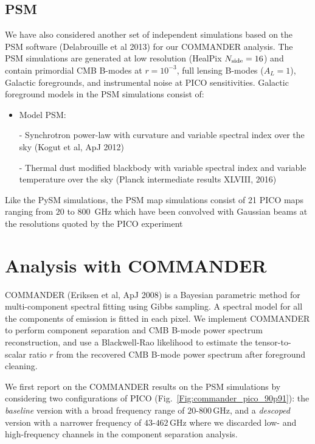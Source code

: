\documentclass[12pt]{article}
\begin{document}
\subsection{PSM}\label{subsec:psm}

We have also considered another set of independent simulations based on the PSM software (Delabrouille et al 2013) for our COMMANDER analysis. The PSM simulations are generated at low resolution (HealPix $N_{\rm side}=16$) and contain primordial CMB B-modes at $r=10^{-3}$, full lensing B-modes ($A_L=1$), Galactic foregrounds, and instrumental noise at PICO sensitivities. Galactic foreground models in the PSM simulations consist of:

\begin{itemize}
\item Model PSM: 

- Synchrotron power-law with curvature and variable spectral index over the sky (Kogut et al, ApJ 2012)

- Thermal dust modified blackbody with variable spectral index and variable temperature over the sky (Planck intermediate results XLVIII, 2016)

\end{itemize}

Like the PySM simulations, the PSM map simulations consist of 21 PICO maps ranging from $20$ to $800$\, GHz which have been convolved with Gaussian beams at the resolutions quoted by the PICO experiment 


\section{Analysis with COMMANDER}

COMMANDER (Eriksen et al, ApJ 2008) is a Bayesian parametric method for multi-component spectral fitting using Gibbs sampling. A spectral model for all the components of emission is fitted in each pixel. We implement COMMANDER to perform component separation and CMB B-mode power spectrum reconstruction, and use a Blackwell-Rao likelihood to estimate the tensor-to-scalar ratio $r$ from the recovered CMB B-mode power spectrum after foreground cleaning.

We first report on the COMMANDER results on the PSM simulations by considering two configurations of PICO (Fig.~\ref{Fig:commander_pico_90p91}): the \emph{baseline} version with a broad frequency range of {$20$-$800$\,GHz}, and a \emph{descoped} version with a narrower frequency of {$43$-$462$\,GHz} where we discarded low- and high-frequency channels in the component separation analysis.
\end{document}
